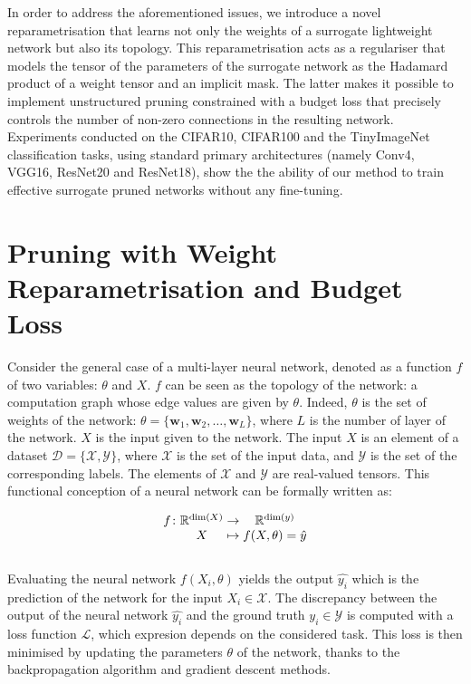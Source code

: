 In order to address the aforementioned issues, we introduce a novel
reparametrisation that learns not only the weights of a surrogate lightweight
network but also its topology. This reparametrisation acts as a regulariser that
models the tensor of the parameters of the surrogate network as the Hadamard
product of a weight tensor and an implicit mask. The latter makes it possible to
implement unstructured pruning constrained with a budget loss that precisely
controls the number of non-zero connections in the resulting network.
Experiments conducted on the CIFAR10, CIFAR100 and the TinyImageNet
classification tasks, using standard primary architectures (namely Conv4, VGG16,
ResNet20 and ResNet18), show the the ability of our method to train effective
surrogate pruned networks without any fine-tuning.


\section{Pruning with Weight Reparametrisation and Budget Loss}
Consider the general case of a multi-layer neural network, denoted as a function
$f$ of two variables: $\theta$ and $X$. $f$ can be seen as the topology of the
network: a computation graph whose edge values are given by $\theta$. Indeed,
$\theta$ is the set of weights of the network: $\theta = \{\mathbf{w}_1,
\mathbf{w}_2, \ldots, \mathbf{w}_L\}$, where $L$ is the number of layer of the
network. $X$ is the input given to the network. The input $X$ is an element of a
dataset $\mathcal{D}=\{ \mathcal{X}, \mathcal{Y} \}$, where $\mathcal{X}$ is the
set of the input data, and $\mathcal{Y}$ is the set of the corresponding labels.
The elements of $\mathcal{X}$ and $\mathcal{Y}$ are real-valued tensors. This
functional conception of a neural network can be formally written as:

\begin{equation}
    \begingroup
  \setlength\arraycolsep{0pt}
  f \colon\begin{array}[t]{c >{{}}c<{{}} c}
             \mathbb{R}^{\dim (X)} & \to & \mathbb{R}^{\dim (y)} \\ 
             X & \mapsto & f(X, \theta) = \hat{y} 
          \end{array}
  \endgroup
\end{equation}\\

Evaluating the neural network $f(X_i, \theta)$ yields the output $\hat{y_i}$
which is the prediction of the network for the input $X_i\in\mathcal{X}$. The
discrepancy between the output of the neural network $\hat{y_i}$ and the ground
truth $y_i \in \mathcal{Y}$ is computed with a loss function $\mathcal{L}$,
which expresion depends on the considered task. This loss is then minimised by
updating the parameters $\theta$ of the network, thanks to the backpropagation
algorithm \cite{rumelhart1985learning,rumelhart1986learning} and gradient
descent methods.\\

